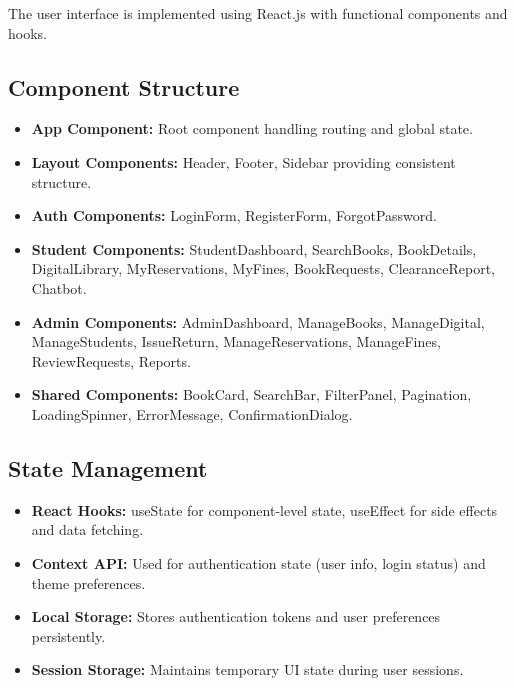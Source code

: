 \documentclass[12pt,a4paper]{report}
\begin{document}
The user interface is implemented using React.js with functional components and hooks.

\subsection{Component Structure}

\begin{itemize}
    \item \textbf{App Component:} Root component handling routing and global state.
    
    \item \textbf{Layout Components:} Header, Footer, Sidebar providing consistent structure.
    
    \item \textbf{Auth Components:} LoginForm, RegisterForm, ForgotPassword.
    
    \item \textbf{Student Components:} StudentDashboard, SearchBooks, BookDetails, DigitalLibrary, MyReservations, MyFines, BookRequests, ClearanceReport, Chatbot.
    
    \item \textbf{Admin Components:} AdminDashboard, ManageBooks, ManageDigital, ManageStudents, IssueReturn, ManageReservations, ManageFines, ReviewRequests, Reports.
    
    \item \textbf{Shared Components:} BookCard, SearchBar, FilterPanel, Pagination, LoadingSpinner, ErrorMessage, ConfirmationDialog.
\end{itemize}

\subsection{State Management}

\begin{itemize}
    \item \textbf{React Hooks:} useState for component-level state, useEffect for side effects and data fetching.
    
    \item \textbf{Context API:} Used for authentication state (user info, login status) and theme preferences.
    
    \item \textbf{Local Storage:} Stores authentication tokens and user preferences persistently.
    
    \item \textbf{Session Storage:} Maintains temporary UI state during user sessions.
\end{itemize}
\end{document}
